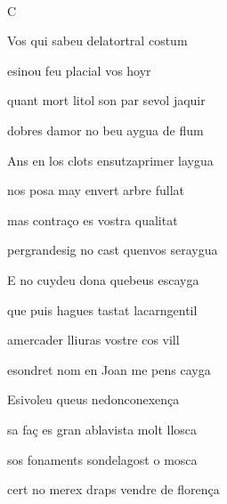 \documentclass[12pt]{article}
\renewcommand{\espaiAbansEtiquetaPoema}{\vspace{0ex}}
\begin{document}
\begin{estrofa}

\espaiAbansEtiquetaPoema

\\

\begin{rubrica}

C

\end{rubrica}

\end{estrofa}


\begin{estrofa}

 Vos qui sabeu delatortral costum

 esinou feu placial vos hoyr

 quant mort litol son par sevol jaquir

 dobres damor no beu aygua de flum

 Ans en los clots ensutzaprimer laygua

 nos posa may envert arbre fullat

 mas contra\c{c}o es vostra qualitat

 pergrandesig no cast quenvos seraygua

\end{estrofa}



\begin{estrofa}

 E no cuydeu dona quebeus escayga

 que puis hagues tastat lacarngentil

 amercader lliuras vostre cos vill

 esondret nom en Joan me pens cayga

 Esivoleu queus nedonconexen\c{c}a

 sa fa\c{c} es gran ablavista molt llosca

 sos fonaments sondelagost o mosca

 cert no merex draps vendre de floren\c{c}a

\end{estrofa}
\end{document}
